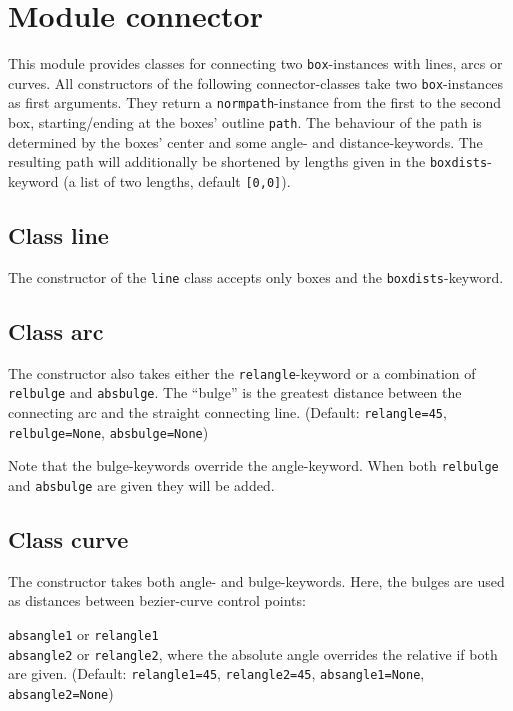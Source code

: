 \chapter{Module connector}
\label{connector}

This module provides classes for connecting two \verb|box|-instances with
lines, arcs or curves.
All constructors of the following connector-classes take two
\verb|box|-instances as first arguments. They return a
\verb|normpath|-instance from the first to the second box, starting/ending at
the boxes' outline \verb|path|. The behaviour of the path is determined by the
boxes' center and some angle- and distance-keywords. The resulting path will
additionally be shortened by lengths given in the \verb|boxdists|-keyword (a
list of two lengths, default \verb|[0,0]|).

\section{Class line}

The constructor of the \verb|line| class accepts only boxes and the
\verb|boxdists|-keyword.

\section{Class arc}

The constructor also takes either the \verb|relangle|-keyword or a combination
of \verb|relbulge| and \verb|absbulge|. The ``bulge'' is the greatest distance
between the connecting arc and the straight connecting line.
(Default: \verb|relangle=45|, \verb|relbulge=None|,
\verb|absbulge=None|)\medskip

Note that the bulge-keywords override the angle-keyword. When both 
\verb|relbulge| and \verb|absbulge| are given they will be added.

\section{Class curve}

The constructor takes both angle- and bulge-keywords. Here, the bulges are
used as distances between bezier-curve control points:\medskip

\verb|absangle1| or \verb|relangle1|\\
\verb|absangle2| or \verb|relangle2|, where the absolute angle overrides the
relative if both are given. (Default: \verb|relangle1=45|,
\verb|relangle2=45|, \verb|absangle1=None|, \verb|absangle2=None|)\medskip

